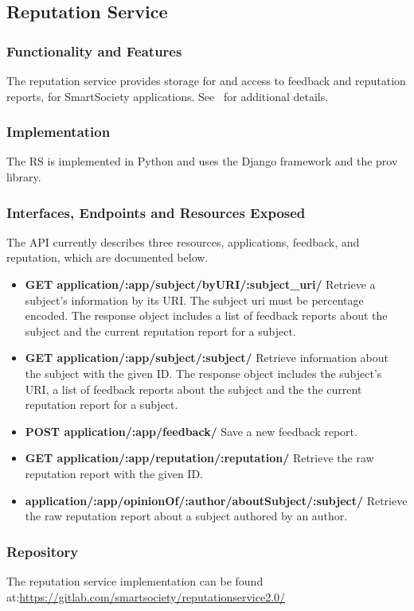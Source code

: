 \subsection{Reputation Service}
\subsubsection{Functionality and Features}
The reputation service provides storage for and access to feedback and reputation reports, for SmartSociety applications. See~\cite{D2.4} for additional details.
\subsubsection{Implementation}
The RS is implemented in Python and uses the Django framework and the prov library.
\subsubsection{Interfaces, Endpoints and Resources Exposed}
The API currently describes three resources, applications, feedback, and reputation, which are documented below. 
\begin{itemize}
\item {\bf GET application/:app/subject/byURI/:subject\_uri/} Retrieve a subject’s information by its URI. The subject uri must be percentage encoded. The response object includes a list of feedback reports about the subject and the current reputation report for a subject.
\item {\bf GET application/:app/subject/:subject/} Retrieve information about the subject with the given ID. The response object includes the subject’s URI, a list of feedback reports about the subject and the the current reputation report for a subject.
\item {\bf POST application/:app/feedback/} Save a new feedback report. 
\item {\bf GET application/:app/reputation/:reputation/} Retrieve the raw reputation report with the given ID.
\item {\bf application/:app/opinionOf/:author/aboutSubject/:subject/} Retrieve the raw reputation report about a subject authored by an author.
\end{itemize}

\subsubsection{Repository}
The reputation service implementation can be found at:\url{https://gitlab.com/smartsociety/reputationservice2.0/}
